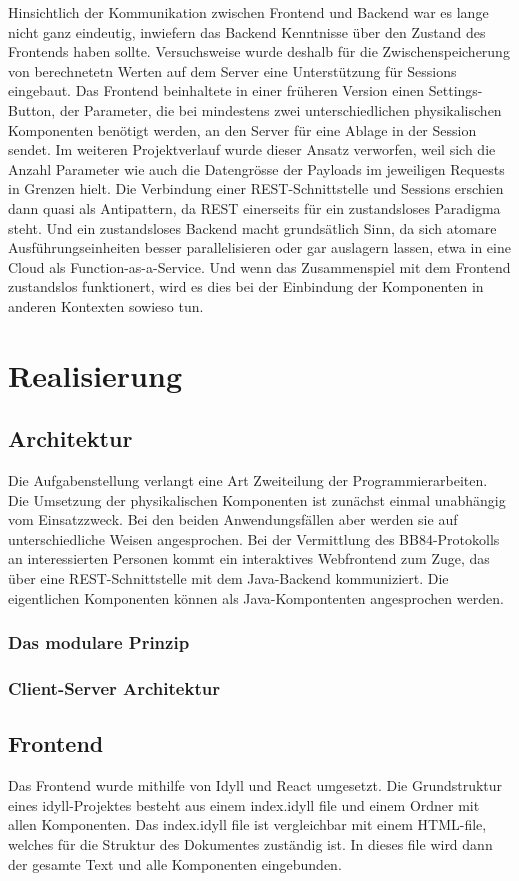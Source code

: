 \documentclass[a4paper,10.2pt,pdftex]{scrartcl}%
\begin{document}
Hinsichtlich der Kommunikation zwischen Frontend und Backend war es lange nicht ganz eindeutig, inwiefern das Backend Kenntnisse über den Zustand des Frontends haben sollte. Versuchsweise wurde deshalb für die Zwischenspeicherung von berechnetetn Werten auf dem Server eine Unterstützung für Sessions eingebaut. Das Frontend beinhaltete in einer früheren Version einen Settings-Button, der Parameter, die bei mindestens zwei unterschiedlichen physikalischen Komponenten benötigt werden, an den Server für eine Ablage in der Session sendet. Im weiteren Projektverlauf wurde dieser Ansatz verworfen, weil sich die Anzahl Parameter wie auch die Datengrösse der Payloads im jeweiligen Requests in Grenzen hielt. Die Verbindung einer REST-Schnittstelle und Sessions erschien dann quasi als Antipattern, da REST einerseits für ein zustandsloses Paradigma steht. Und ein zustandsloses Backend macht grundsätlich Sinn, da sich atomare Ausführungseinheiten besser parallelisieren oder gar auslagern lassen, etwa in eine Cloud als Function-as-a-Service. Und wenn das Zusammenspiel mit dem Frontend zustandslos funktionert, wird es dies bei der Einbindung der Komponenten in anderen Kontexten sowieso tun. 

\section{Realisierung}
\subsection{Architektur}
Die Aufgabenstellung verlangt eine Art Zweiteilung der Programmierarbeiten. Die Umsetzung der physikalischen Komponenten ist zunächst einmal unabhängig vom Einsatzzweck. Bei den beiden Anwendungsfällen aber werden sie auf unterschiedliche Weisen angesprochen. Bei der Vermittlung des BB84-Protokolls an interessierten Personen kommt ein interaktives Webfrontend zum Zuge, das über eine REST-Schnittstelle mit dem Java-Backend kommuniziert. Die eigentlichen Komponenten können als Java-Kompontenten angesprochen werden. 
\subsubsection{Das modulare Prinzip}  
\subsubsection{Client-Server Architektur}

\subsection{Frontend}
Das Frontend wurde mithilfe von Idyll und React umgesetzt. Die Grundstruktur eines idyll-Projektes besteht aus einem index.idyll file und einem Ordner mit allen Komponenten. Das index.idyll file ist vergleichbar mit einem HTML-file, welches für die Struktur des Dokumentes zuständig ist. In dieses file wird dann der gesamte Text und alle Komponenten eingebunden.
\end{document}
